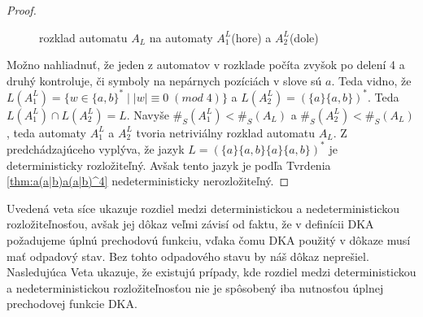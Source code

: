 \begin{proof}
\begin{figure}[H]
\caption{rozklad automatu $ A_L $ na automaty $ A_1^L $(hore) a $ A_2^L $(dole)}
\end{figure}

Možno nahliadnuť, že jeden z automatov v rozklade počíta zvyšok po delení 4 a druhý kontroluje, či symboly na nepárnych pozíciách v slove sú $ a $. Teda vidno, že $ L(A_1^L) = \lbrace w \in \lbrace a,b \rbrace^* \; | \; |w| \equiv 0 \; (mod \; 4) \rbrace $ a $ L(A_2^L) = (\lbrace a \rbrace \lbrace a,b \rbrace)^* $. Teda $ L(A_1^L) \cap L(A_2^L) = L $. Navyše $ \#_S(A_1^L) < \#_S(A_L) $ a $ \#_S(A_2^L) < \#_S(A_L) $, teda automaty $ A_1^L $ a $ A_2^L $ tvoria netriviálny rozklad automatu $ A_L $. Z predchádzajúceho vyplýva, že jazyk $ L = (\lbrace a \rbrace \lbrace a,b \rbrace \lbrace a \rbrace \lbrace a,b \rbrace)^* $ je deterministicky rozložiteľný. Avšak tento jazyk je podľa Tvrdenia \ref{thm:a(a|b)a(a|b)^4} nedeterministicky nerozložiteľný.
\end{proof}

Uvedená veta síce ukazuje rozdiel medzi deterministickou a nedeterministickou rozložiteľnosťou, avšak jej dôkaz veľmi závisí od faktu, že v definícii DKA požadujeme úplnú prechodovú funkciu, vďaka čomu DKA použitý v dôkaze musí mať odpadový stav. Bez tohto odpadového stavu by náš dôkaz neprešiel. Nasledujúca Veta ukazuje, že existujú prípady, kde rozdiel medzi deterministickou a nedeterministickou rozložiteľnosťou nie je spôsobený iba nutnosťou úplnej prechodovej funkcie DKA.

